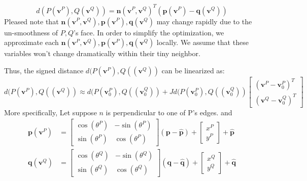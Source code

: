 \documentclass[12pt]{article}
\newcommand{\bn}{\mathbf{n}}
\newcommand{\bq}{\mathbf{q}}
\newcommand{\bp}{\mathbf{p}}
\newcommand{\tq}{\mathbf{\hat{q}}}
\newcommand{\tp}{\mathbf{\hat{p}}}
\newcommand{\bv}{\mathbf{v}}
\begin{document}
\begin{equation}
	d(P(\bv^P), Q(\bv^Q)) = \bn(\bv^P, \bv^Q)^T(\bp(\bv^P) - \bq(\bv^Q))
\end{equation}
Pleased note that $\bn(\bv^P, \bv^Q), \bp(\bv^P), \bq(\bv^Q)$ may change rapidly due to the un-smoothness of $P, Q$'s face. In order to simplify the optimization, we approximate each $\bn(\bv^P, \bv^Q), \bp(\bv^P), \bq(\bv^Q)$ locally. We assume that these variables won't change dramatically within their tiny neighbor.\par
Thus, the signed distance $d(P(\bv^P), Q((\bv^Q))$ can be linearized as:
\begin{equation}
	d(P(\bv^P), Q((\bv^Q)) \approx d(P(\bv^P_0), Q((\bv^Q_0))+ Jd(P(\bv^P_0), Q((\bv^Q_0))\begin{bmatrix}
		(\bv^P - \bv^P_0)^T \\
		(\bv^Q - \bv^Q_0)^T
	\end{bmatrix}
	\end{equation}
More specifically, Let suppose $n$ is perpendicular to one of P's edges. and
\begin{align}
	\bp(\bv^P)  &= \begin{bmatrix}
	\cos(\theta^P) & -\sin(\theta^P)\\
	\sin(\theta^P) & \cos(\theta^P)
	\end{bmatrix}(\bp -\tp) + \begin{bmatrix}
	x^P\\
	\label{eq:p_transformation}
	y^P
	\end{bmatrix} +\tp \\
	\bq(\bv^Q)  &= \begin{bmatrix}
	\cos(\theta^Q) & -\sin(\theta^Q)\\
	\sin(\theta^Q) & \cos(\theta^Q)
	\end{bmatrix}(\bq -\tq) + \begin{bmatrix}
	x^Q\\
	y^Q
	\end{bmatrix} +\tq
	\label{eq:q_transformation}
\end{align}
	
\end{document}
